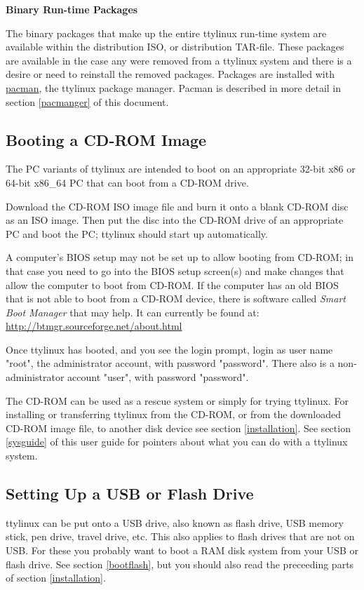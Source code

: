\documentclass[10pt]{article}
\begin{document}
{\bf Binary Run-time Packages}

The binary packages that make up the entire ttylinux run-time system are
available within the distribution ISO, or distribution TAR-file. These packages
are available in the case any were removed from a ttylinux system and there is
a desire or need to reinstall the removed packages. Packages are installed with
\url{pacman}, the ttylinux package manager. Pacman is described in more detail
in section \ref{pacmanger} of this document.

\subsection{Booting a CD-ROM Image}
\label{bootcd}

The PC variants of ttylinux are intended to boot on an appropriate 32-bit x86
or 64-bit x86\_64 PC that can boot from a CD-ROM drive.

Download the CD-ROM ISO image file and burn it onto a blank CD-ROM disc as an
ISO image. Then put the disc into the CD-ROM drive of an appropriate PC and
boot the PC; ttylinux should start up automatically.

A computer's BIOS setup may not be set up to allow booting from CD-ROM; in that
case you need to go into the BIOS setup screen(s) and make changes that allow
the computer to boot from CD-ROM. If the computer has an old BIOS that is not
able to boot from a CD-ROM device, there is software called {\it Smart Boot
Manager} that may help. It can currently be found at:
\url{http://btmgr.sourceforge.net/about.html}

Once ttylinux has booted, and you see the login prompt, login as user name
"root", the administrator account, with password "password". There also is a
non-administrator account "user", with password "password".

The CD-ROM can be used as a rescue system or simply for trying ttylinux. For
installing or transferring ttylinux from the CD-ROM, or from the downloaded
CD-ROM image file, to another disk device see section \ref{installation}. See
section \ref{sysguide} of this user guide for pointers about what you can do
with a ttylinux system.

\subsection{Setting Up a USB or Flash Drive}

ttylinux can be put onto a USB drive, also known as flash drive, USB memory
stick, pen drive, travel drive, etc. This also applies to flash drives that are
not on USB. For these you probably want to boot a RAM disk system from your USB
or flash drive. See section \ref{bootflash}, but you should also read the
preceeding parts of section \ref{installation}.
\end{document}
